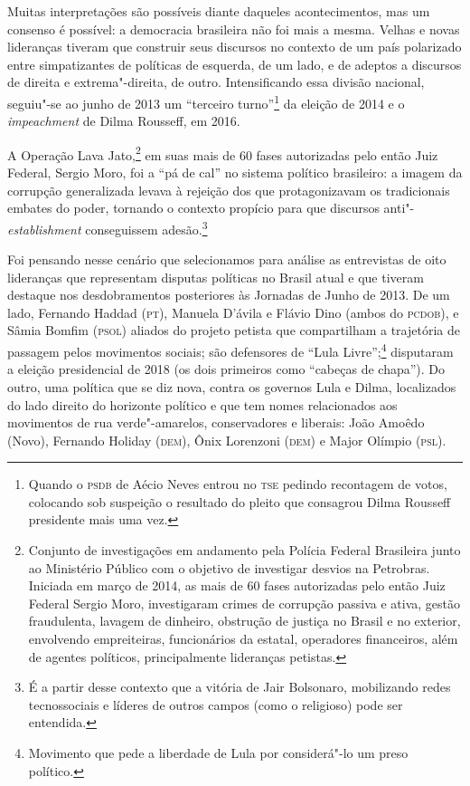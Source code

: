Muitas interpretações são possíveis diante daqueles acontecimentos, mas
um consenso é possível: a democracia brasileira não foi mais a mesma.
Velhas e novas lideranças tiveram que construir seus discursos no
contexto de um país polarizado entre simpatizantes de políticas de
esquerda, de um lado, e de adeptos a discursos de direita e
extrema"-direita, de outro. Intensificando essa divisão nacional,
seguiu"-se ao junho de 2013 um ``terceiro turno''\footnote{Quando o \textsc{psdb} de
  Aécio Neves entrou no \textsc{tse} pedindo recontagem de votos, colocando sob
  suspeição o resultado do pleito que consagrou Dilma Rousseff
  presidente mais uma vez.} da eleição de 2014 e o \emph{impeachment}
de Dilma Rousseff, em 2016.

A Operação Lava Jato,\footnote{Conjunto de investigações em andamento
  pela Polícia Federal Brasileira junto ao Ministério Público com o
  objetivo de investigar desvios na Petrobras. Iniciada em março de
  2014, as mais de 60 fases autorizadas pelo então Juiz Federal Sergio
  Moro, investigaram crimes de corrupção passiva e ativa, gestão
  fraudulenta, lavagem de dinheiro, obstrução de justiça no Brasil e no
  exterior, envolvendo empreiteiras, funcionários da estatal, operadores
  financeiros, além de agentes políticos, principalmente lideranças
  petistas.} em suas mais de 60 fases autorizadas pelo então Juiz
Federal, Sergio Moro, foi a ``pá de cal'' no sistema político
brasileiro: a imagem da corrupção generalizada levava à rejeição dos que
protagonizavam os tradicionais embates do poder, tornando o contexto
propício para que discursos anti"-\emph{establishment} conseguissem
adesão.\footnote{É a partir desse contexto que a vitória de Jair
  Bolsonaro, mobilizando redes tecnossociais e líderes de outros campos
  (como o religioso) pode ser entendida.}

Foi pensando nesse cenário que selecionamos para análise as entrevistas
de oito lideranças que representam disputas políticas no Brasil atual e
que tiveram destaque nos desdobramentos posteriores às Jornadas de Junho
de 2013. De um lado, Fernando Haddad (\textsc{pt}), Manuela D'ávila e Flávio Dino
(ambos do \textsc{pcdob}), e Sâmia Bomfim (\textsc{psol}) aliados do projeto petista que
compartilham a trajetória de passagem pelos movimentos sociais; são
defensores de ``Lula Livre'';\footnote{Movimento que pede a liberdade de
  Lula por considerá"-lo um preso político.} disputaram a eleição
presidencial de 2018 (os dois primeiros como ``cabeças de chapa''). Do
outro, uma política que se diz nova, contra os governos Lula e Dilma,
localizados do lado direito do horizonte político e que tem nomes
relacionados aos movimentos de rua verde"-amarelos, conservadores e
liberais: João Amoêdo (Novo), Fernando Holiday (\textsc{dem}), Ônix Lorenzoni
(\textsc{dem}) e Major Olímpio (\textsc{psl}).

